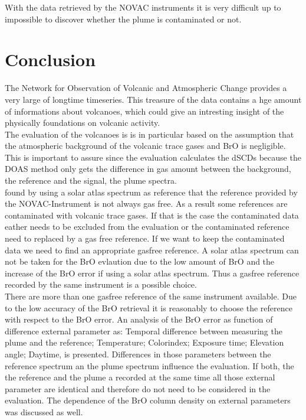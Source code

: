 \documentclass  [
  paper    = a4,
  BCOR     = 10mm,
  twoside,
  fontsize = 12pt,
  fleqn,
  toc      = bibnumbered,
  toc      = listofnumbered,
  numbers  = noendperiod,
  headings = normal,
  listof   = leveldown,
  version  = 3.03
]                                       {scrreprt}
\begin{document}
	  With the data retrieved by the NOVAC instruments it is very difficult up to impossible to discover whether the plume is contaminated or not. 




	\chapter{Conclusion}
	
	The Network for Observation of Volcanic and Atmospheric Change provides a very large of longtime timeseries. This treasure of the data contains a hge amount of informations about volcanoes, which could give an intresting insight of the physically foundations on volcanic activity.\\
	The evaluation of the volcanoes is is in particular based on the assumption that the atmospheric background of the volcanic trace gases  and BrO is negligible. This is important to assure since the evaluation calculates the dSCDs because the DOAS method only gets the difference in gas amount between the background, the reference and the signal, the plume spectra.\\
	\citet{lubcke2014bro} found by using a solar atlas spectrum as reference that the reference provided by the NOVAC-Instrument is not always gas free. As a result some references are contaminated with volcanic trace gases. If that is the case the contaminated data eather needs to be excluded from the evaluation or the contaminated reference need to replaced by a gas free reference. If we want to keep the contaminated data we need to find an appropriate gasfree reference. A solar atlas spectrum can not be taken for the BrO evlaution due to the low amount of BrO and the increase of the BrO error if using a solar atlas spectrum. Thus a gasfree reference recorded by the same instrument is a possible choice.\\
	There are more than one gasfree reference of the same instrument available. Due to the low accuracy of the BrO retrieval it is reasonably to choose the reference with respect to the BrO error.
	An analysis of the BrO error as function of difference external parameter as: Temporal difference between measuring the plume and the reference; Temperature; Colorindex; Exposure time; Elevation angle;  Daytime, is presented. Differences in those parameters between the reference spectrum an the plume spectrum influence the evaluation. If both, the the reference and the plume a recorded at the same time all those external parameter are identical and therefore do not need to be considered in the evaluation. The dependence of the BrO column density on external parameters was discussed as well. \\
\end{document}
